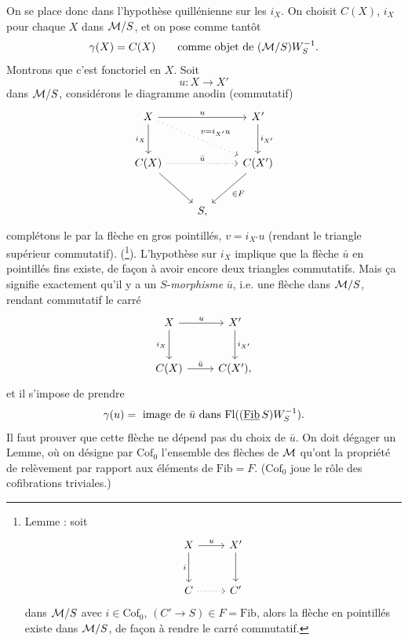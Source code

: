 On se place donc dans l'hypothèse quillénienne sur les $i_X$. On choisit $C(X)$, $i_X$ pour
chaque $X$ dans $\mathcal{M}/S$, et on pose comme tantôt
\[
\gamma(X)=C(X) \qquad \text{comme objet de $(\mathcal{M}/S)W_S^{-1}$.}
\]
Montrons que c'est fonctoriel en $X$. Soit
\[
u:X\longrightarrow X'
\]
dans $\mathcal{M}/S$, considérons le diagramme anodin (commutatif)
\[
\begin{tikzcd}[row sep=large]
X \arrow[rr, "u"] \arrow[d, "i_X"'] \arrow[drr, loosely dotted, "v=i_{X'}u"] & & X' \arrow[d, "i_{X'}"] \\
C(X) \arrow[rr, dotted, "\bar{u}"] \arrow[dr] & & C(X') \arrow[dl, "\in F"] \\
& S, &
\end{tikzcd}
\]
complétons le par la flèche en gros pointillés, $v=i_{X'}u$ (rendant le triangle supérieur
commutatif). (\footnote[54]{Lemme : soit
\[
\begin{tikzcd}[ampersand replacement=\&, row sep=large]
X \arrow[r, "u"] \arrow[d, "i"'] \& X' \arrow[d] \\
C \arrow[r, dotted] \& C'
\end{tikzcd}
\]
dans $\mathcal{M}/S$ avec $i\in\mathrm{Cof}_0$, $(C'\longrightarrow S)\in F=\mathrm{Fib}$, alors la flèche en pointillés existe dans $\mathcal{M}/S$, de façon
à rendre le carré commutatif.}). L'hypothèse sur $i_X$ implique que la flèche $\bar{u}$ en pointillés fins existe,
de façon à avoir encore deux triangles commutatifs. Mais ça signifie exactement qu'il y a
un $S$-\textit{morphisme} $\bar{u}$, i.e. une flèche dans $\mathcal{M}/S$, rendant commutatif le carré
\[
\begin{tikzcd}[row sep=large]
X \arrow[r, "u"] \arrow[d, "i_X"'] & X' \arrow[d, "i_{X'}"] \\
C(X) \arrow[r, "\bar{u}"] & C(X'),
\end{tikzcd}
\]
et il s'impose de prendre
\[
\gamma(u)=\ \text{image de $\bar{u}$ dans $\mathrm{Fl}((\underline{\mathrm{Fib}}\, S)W_S^{-1})$.}
\]
Il faut prouver que cette flèche ne dépend pas du choix de $\bar{u}$. On doit dégager un Lemme,
où on désigne par $\mathrm{Cof}_0$ l'ensemble des flèches de $\mathcal{M}$ qu'ont %
la propriété de relèvement par
rapport aux éléments de $\mathrm{Fib}=F$. ($\mathrm{Cof}_0$ joue le rôle des cofibrations triviales.)

